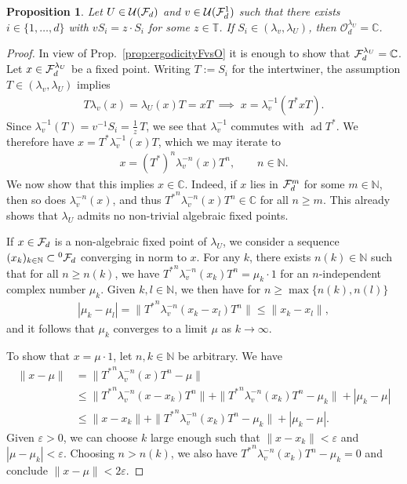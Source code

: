 \documentclass[12pt,a4paper]{amsart}
\numberwithin{equation}{section}
\newtheorem{proposition}[theorem]{Proposition}
\theoremstyle{remark}
\DeclareMathOperator{\ad}{ad}
\def\C{\mathbb{C}}
\def\N{\mathbb{N}}
\def\T{\mathbb{T}}
\newcommand{\la}{\lambda}
\newcommand{\eps}{\varepsilon}
\newcommand{\CO}[0]{\mathcal{O}} \newcommand{\CP}[0]{\mathcal{P}}
\newcommand{\CU}[0]{\mathcal{U}} \newcommand{\CV}[0]{\mathcal{V}}
\begin{document}
\begin{proposition}\label{prop:SiGeneratorNoFixedPoints}
    Let $U\in\CU(\CF_d)$ and $v\in\CU(\CF_d^1)$ such that there exists $i\in\{1,\ldots,d\}$ with $vS_i=z\cdot S_i$ for some $z\in\T$. If $S_i\in(\la_v,\la_U)$, then $\CO_d^{\la_U}=\C$. 
\end{proposition}
\begin{proof}
    In view of Prop.~\ref{prop:ergodicityFvsO} it is enough to show that $\CF_d^{\la_U}=\C$. Let $x\in\mathcal{F}_d^{\lambda_U}$ be a fixed point. Writing $T:=S_i$ for the intertwiner, the assumption $T\in(\la_v,\la_U)$ implies
    \begin{align}
        T\la_v(x)=\la_U(x)T=xT
        \;\implies\;
        x=\la_v^{-1}(T^*xT).
    \end{align}
    Since $\la_v^{-1}(T)=v^{-1}S_i=\frac{1}{z}\,T$, we see that $\la_v^{-1}$ commutes with $\ad T^*$. We therefore have $x=T^*\la_v^{-1}(x)T$, which we may iterate to 
    \begin{align}
     x=(T^*)^n\la_v^{-n}(x)T^n,\qquad n\in\N.
    \end{align}
    We now show that this implies $x\in\C$. Indeed, if $x$ lies in $\mathcal{F}_d^m$ for some $m\in\N$, then so does $\lambda_v^{-n}(x)$, and thus ${T^*}^n\lambda_v^{-n}(x)T^n\in\C$ for all $n\geq m$. This already shows that $\la_U$ admits no non-trivial algebraic fixed points. 
    
    If $x\in\mathcal{F}_d$ is a non-algebraic fixed point of $\la_U$, we consider a sequence $(x_k)_{k\in\N}\subset{}^0\CF_d$ converging in norm to $x$. For any $k$, there exists $n(k)\in\N$ such that for all $n\geq n(k)$, we have ${T^*}^n\lambda_v^{-n}(x_k)T^n=\mu_k\cdot1$ for an $n$-independent complex number $\mu_k$. Given $k,l\in\N$, we then have for $n\geq\max\{n(k),n(l)\}$
    \begin{align*}
     |\mu_k-\mu_l|=\|{T^*}^n\lambda_v^{-n}(x_k-x_l)T^n\|
     \leq
     \|x_k-x_l\|,
    \end{align*}
    and it follows that $\mu_k$ converges to a limit $\mu$ as $k\to\infty$. 
    
    To show that $x=\mu\cdot1$, let $n,k\in\N$ be arbitrary. We have
    \begin{align*}
     \|x-\mu\|
     &=
     \|{T^*}^n\la_v^{-n}(x)T^n-\mu\|
     \\
     &\leq
     \|{T^*}^n\la_v^{-n}(x-x_k)T^n\|+\|{T^*}^n\la_v^{-n}(x_k)T^n-\mu_k\|+|\mu_k-\mu|
     \\
     &\leq
     \|x-x_k\|+\|{T^*}^n\la_v^{-n}(x_k)T^n-\mu_k\|+|\mu_k-\mu|.
    \end{align*}
    Given $\eps>0$, we can choose $k$ large enough such that $\|x-x_k\|<\eps$ and $|\mu-\mu_k|<\eps$. Choosing $n>n(k)$, we also have ${T^*}^n\la_v^{-n}(x_k)T^n-\mu_k=0$ and conclude $\|x-\mu\|<2\eps$.
\end{proof}
\end{document}
